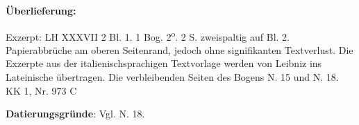    
        
        \begin{ledgroupsized}[r]{120mm}
        \footnotesize 
        \pstart        
        \noindent\textbf{\"{U}berlieferung:}  
        \pend
        \end{ledgroupsized}
      
       
              \begin{ledgroupsized}[r]{114mm}
              \footnotesize 
              \pstart \parindent -6mm
              Exzerpt: LH XXXVII 2 Bl. 1. 1 Bog. 2\textsuperscript{o}. 2 S. zweispaltig auf Bl. 2. Papierabbr\"{u}che am oberen Seitenrand, jedoch ohne signifikanten Textverlust. Die Exzerpte aus der italienischsprachigen Textvorlage werden von Leibniz ins Lateinische \"{u}bertragen. Die verbleibenden Seiten des Bogens N. 15 und N. 18.\\KK 1, Nr. 973 C \pend
              \end{ledgroupsized}
        \vspace*{5mm}
        \begin{ledgroup}
        \footnotesize 
        \pstart
      \noindent\footnotesize{\textbf{Datierungsgr\"{u}nde}: Vgl. N. 18.}
        \pend
        \end{ledgroup}
      
